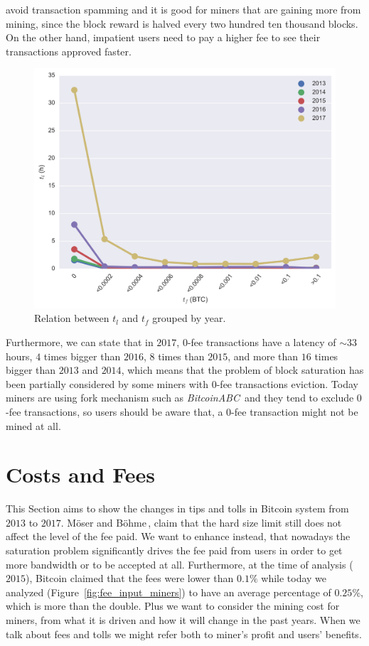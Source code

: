 \documentclass[USenglish]{uit-thesis}
\begin{document}
avoid transaction spamming and it is good for miners that are gaining
more from mining, since the block reward is halved every two
hundred ten thousand blocks.
On the other hand, impatient users need to pay a higher fee to
see their transactions approved faster.
\begin{figure}[h]
	\centering
	\includegraphics[width=1\textwidth]{img/fee_latency}
	\caption{Relation between $t_l$ and $t_f$ grouped by year.}
	\label{fig:fee_latency}
\end{figure}
Furthermore, we can state that in $2017$,
$0$-fee transactions have a latency of $\sim$$33$\,hours,
$4$ times bigger than $2016$, $8$ times than $2015$,
and more than $16$
times bigger than $2013$ and $2014$, which means that the problem
of block saturation has been partially considered by some miners
with $0$-fee transactions eviction.
Today miners are using fork mechanism such
as \emph{BitcoinABC}\,\cite{bitcoinabc} and they tend to exclude
$0$-fee transactions, so users should be aware that,
a $0$-fee transaction might not be mined at all.

\section{Costs and Fees}
\label{sec:feesandtolls}
This Section aims to show the changes in tips and tolls in Bitcoin
system from $2013$ to $2017$.
Möser and Böhme\,\cite{Moser2015}, claim that
the hard size limit still does not affect the level of the fee paid.
We want to enhance instead, that nowadays the saturation
problem significantly drives the fee paid
from users in order to get more bandwidth
or to be accepted at all. Furthermore, at the time
of analysis ($2015$), Bitcoin claimed that the fees were
lower than $0.1\%$ while today
we analyzed (Figure~\ref{fig:fee_input_miners})
to have an average
percentage of $0.25$\%,
which is more than the double.
Plus we want to consider the mining cost
for miners, from what it is driven and how it will change
in the past years.
When we talk about fees and tolls we might refer both to miner's
profit and users' benefits.
\end{document}
